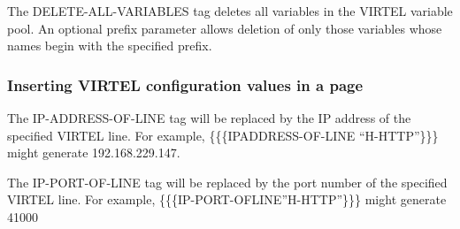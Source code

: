 \documentclass[letterpaper,10pt,english]{sphinxmanual}
\begin{document}
The DELETE-ALL-VARIABLES tag deletes all variables in the VIRTEL variable pool. An optional prefix parameter allows deletion of only those variables whose names begin with the specified prefix.


\subsubsection{Inserting VIRTEL configuration values in a page}
\label{\detokenize{User_Guide:inserting-virtel-configuration-values-in-a-page}}

\begin{sphinxVerbatim}[commandchars=\\\{\}]
 
\end{sphinxVerbatim}

The IP-ADDRESS-OF-LINE tag will be replaced by the IP address of the specified VIRTEL line. For example, \{\{\{IPADDRESS-OF-LINE “H-HTTP”\}\}\} might generate 192.168.229.147.


\begin{sphinxVerbatim}[commandchars=\\\{\}]
 
\end{sphinxVerbatim}

The IP-PORT-OF-LINE tag will be replaced by the port number of the specified VIRTEL line. For example, \{\{\{IP-PORT-OFLINE”H-HTTP”\}\}\} might generate 41000


\begin{sphinxVerbatim}[commandchars=\\\{\}]
 
  
\end{sphinxVerbatim}
\end{document}
